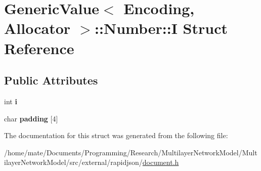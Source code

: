 \hypertarget{structGenericValue_1_1Number_1_1I}{}\section{Generic\+Value$<$ Encoding, Allocator $>$\+:\+:Number\+:\+:I Struct Reference}
\label{structGenericValue_1_1Number_1_1I}
\subsection*{Public Attributes}
\begin{DoxyCompactItemize}
\item 
int {\bfseries i}\hypertarget{structGenericValue_1_1Number_1_1I_ae0b250dc448d284cf9019f3932bfc380}{}\label{structGenericValue_1_1Number_1_1I_ae0b250dc448d284cf9019f3932bfc380}

\item 
char {\bfseries padding} \mbox{[}4\mbox{]}\hypertarget{structGenericValue_1_1Number_1_1I_aefc064997f30c9c0b2bdce187d1d4cce}{}\label{structGenericValue_1_1Number_1_1I_aefc064997f30c9c0b2bdce187d1d4cce}

\end{DoxyCompactItemize}


The documentation for this struct was generated from the following file\+:\begin{DoxyCompactItemize}
\item 
/home/mate/\+Documents/\+Programming/\+Research/\+Multilayer\+Network\+Model/\+Multilayer\+Network\+Model/src/external/rapidjson/\hyperlink{document_8h}{document.\+h}\end{DoxyCompactItemize}
